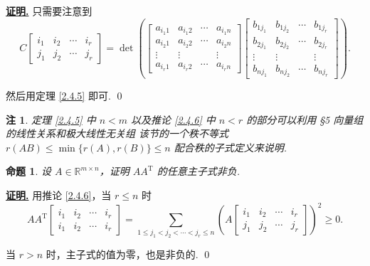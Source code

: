 \documentclass[10pt,openany]{article}
\theoremstyle{thmstyle} %
\theoremstyle{defstyle} %
\theoremstyle{prostyle} %
\newtheorem{proposition}[theorem]{命题}
\theoremstyle{exastyle}
\theoremstyle{remstyle}
\newtheorem{remark}[theorem]{注}
\renewenvironment{proof}[1][证明]{\par\underline{\textbf{#1.}} \;\fangsong}{\qed\par}
\newcommand{\T}{^{\text{T}}}
\newcommand{\R}{\mathbb{R}}
\newcommand{\mn}{^{m \times n}}
\begin{document}
\begin{proof}
	只需要注意到
	\[ C\begin{bmatrix}
		i_1 & i_2 & \cdots & i_r \\
		j_1 & j_2 & \cdots & j_r
	\end{bmatrix}=\det \left( \begin{bmatrix}
	a_{i_1 1} & a_{i_1 2} & \cdots & a_{i_1 n} \\
	a_{i_2 1} & a_{i_2 2} & \cdots & a_{i_2 n} \\
	\vdots    & \vdots    &        & \vdots    \\
	a_{i_r 1} & a_{i_r 2} & \cdots & a_{i_r n}
	\end{bmatrix} \begin{bmatrix}
	b_{1 j_1} & b_{1 j_2} & \cdots & b_{1 j_r} \\
	b_{2 j_1} & b_{2 j_2} & \cdots & b_{2 j_r} \\
	\vdots    & \vdots    &        & \vdots    \\
	b_{n j_1} & b_{n j_2} & \cdots & b_{n j_r}
	\end{bmatrix} \right). \]
	
	然后用定理 \ref{2.4.5} 即可.
\end{proof}

\begin{remark}
	定理 \ref{2.4.5} 中 \( n<m \) 以及推论 \ref{2.4.6} 中 \( n<r \) 的部分可以利用 \textit{\S 5 向量组的线性关系和极大线性无关组} 该节的一个秩不等式 \( r(AB) \leq \min\{ r(A),r(B) \} \leq n \) 配合秩的子式定义来说明.
\end{remark}

\begin{proposition}
	设 \( A \in \R\mn \)，证明 \( AA\T \) 的任意主子式非负.
\end{proposition}

\begin{proof}
	用推论 \ref{2.4.6}，当 \( r \leq n \) 时
	\[ AA\T
	\begin{bmatrix}
		i_1 & i_2 & \cdots & i_r \\
		i_1 & i_2 & \cdots & i_r
	\end{bmatrix}
	=
	\sum_{1 \leq j_1 < j_2 < \cdots < j_r \leq n}
	\left( A
	\begin{bmatrix}
		i_1 & i_2 & \cdots & i_r \\
		j_1 & j_2 & \cdots & j_r
	\end{bmatrix}
	\right)^2
	\geq 0. \]
	
	当 \(  r>n \) 时，主子式的值为零，也是非负的.
\end{proof}
\end{document}
